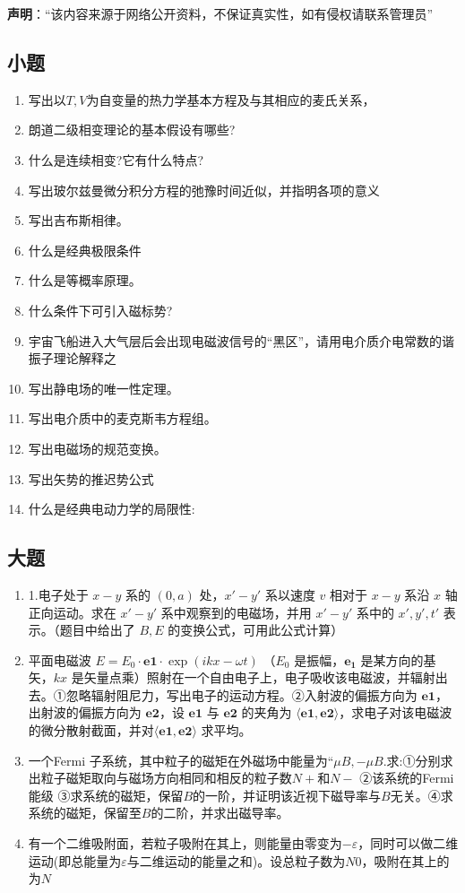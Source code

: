 
\textbf{声明}：“该内容来源于网络公开资料，不保证真实性，如有侵权请联系管理员”
\subsection{小题}
\begin{enumerate}
\item 写出以$T,V$为自变量的热力学基本方程及与其相应的麦氏关系，
\item 朗道二级相变理论的基本假设有哪些?
\item 什么是连续相变?它有什么特点?
\item 写出玻尔兹曼微分积分方程的弛豫时间近似，并指明各项的意义
\item 写出吉布斯相律。
\item 什么是经典极限条件
\item 什么是等概率原理。
\item 什么条件下可引入磁标势?
\item 宇宙飞船进入大气层后会出现电磁波信号的“黑区”，请用电介质介电常数的谐振子理论解释之
\item 写出静电场的唯一性定理。
\item 写出电介质中的麦克斯韦方程组。
\item 写出电磁场的规范变换。
\item 写出矢势的推迟势公式
\item 什么是经典电动力学的局限性:
\end{enumerate}
\subsection{大题}
\begin{enumerate}
\item 1.电子处于 $x-y$ 系的 $(0, a)$ 处，$x'-y'$ 系以速度 $v$ 相对于 $x-y$ 系沿 $x$ 轴正向运动。求在 $x'-y'$ 系中观察到的电磁场，并用 $x'-y'$ 系中的 $x', y', t'$ 表示。（题目中给出了 $B, E$ 的变换公式，可用此公式计算）
\item 平面电磁波 $E = E_0 \cdot \mathbf{e1} \cdot \exp(ikx - \omega t)$ （$E_0$ 是振幅，$\mathbf{e_1}$ 是某方向的基矢，$kx$ 是矢量点乘）照射在一个自由电子上，电子吸收该电磁波，并辐射出去。①忽略辐射阻尼力，写出电子的运动方程。②入射波的偏振方向为 $\mathbf{e1}$，出射波的偏振方向为 $\mathbf{e2}$，设 $\mathbf{e1}$ 与 $\mathbf{e2}$ 的夹角为 $\langle \mathbf{e1}, \mathbf{e2} \rangle$，求电子对该电磁波的微分散射截面，并对$\langle\mathbf{e1}, \mathbf{e2} \rangle$ 求平均。
\item 一个Fermi 子系统，其中粒子的磁矩在外磁场中能量为“$\mu B,-\mu B$.求:①分别求出粒子磁矩取向与磁场方向相同和相反的粒子数$N+$和$N-$ ②该系统的Fermi能级 ③求系统的磁矩，保留$B$的一阶，并证明该近视下磁导率与$B$无关。④求系统的磁矩，保留至$B$的二阶，并求出磁导率。
\item 有一个二维吸附面，若粒子吸附在其上，则能量由零变为$-\varepsilon$，同时可以做二维运动(即总能量为$\varepsilon$与二维运动的能量之和)。设总粒子数为$N0$，吸附在其上的为$N$
\end{enumerate}

